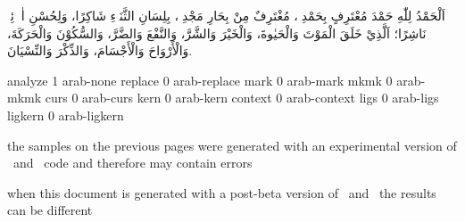 


\startbuffer
اَلْحَمْدُ لِلّٰهِ حَمْدَ مُعْتَرِفٍ بِحَمْدِهٖ، مُغْتَرِفٌ مِنْ بِحَارِ مَجْدِهٖ، بِلِسَانِ
الثَّنَاۤءِ شَاكِرًا، وَلِحُسْنِ اٰلاۤئِهٖ نَاشِرًا؛ اَلَّذِيْ خَلَقَ الْمَوْتَ وَالْحَيٰوةَ، وَالْخَيْرَ
وَالشَّرَّ، وَالنَّفْعَ وَالضَّرَّ، وَالسُّكُوْنَ وَالْحَرَكَةَ، وَالْأَرْوَاحَ
وَالْأَجْسَامَ، وَالذِّكْرَ وَالنِّسْيَانَ.
\stopbuffer

\unexpanded{}

\ShowSample analyze 1 arab-none
\ShowSample replace 0 arab-replace
\ShowSample mark    0 arab-mark
\ShowSample mkmk    0 arab-mkmk
\ShowSample curs    0 arab-curs
\ShowSample kern    0 arab-kern
\ShowSample context 0 arab-context
\ShowSample ligs    0 arab-ligs
\ShowSample ligkern 0 arab-ligkern


\StartItem
    the samples on the previous pages were generated with an experimental version
    of \LUATEX\ and \MKIV\ code and therefore may contain errors
\StopItem

\StartItem
    when this document is generated with a post-beta version of \LUATEX\ and
    \CONTEXT\ the results can be different
\StopItem

\StopTopic

\stopdocument

